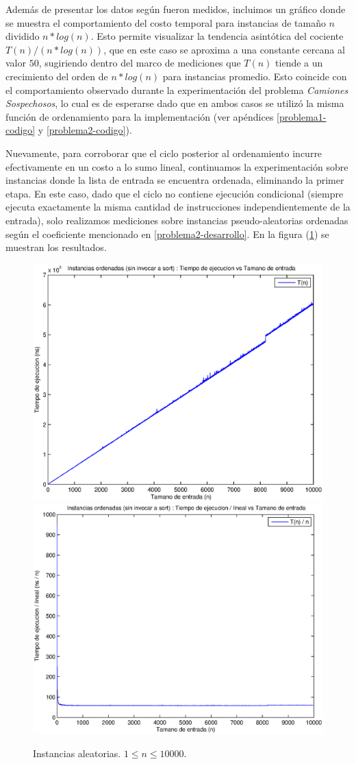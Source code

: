 Además de presentar los datos según fueron medidos, incluimos un gráfico donde se muestra el comportamiento del costo temporal para instancias de tamaño $n$ dividido $n * log(n)$. Esto permite visualizar la tendencia asintótica del cociente $T(n) / (n * log(n))$, que en este caso se aproxima a una constante cercana al valor $50$, sugiriendo dentro del marco de mediciones que $T(n)$ tiende a un crecimiento del orden de $n * log(n)$ para instancias promedio. Esto coincide con el comportamiento observado durante la experimentación del problema \emph{Camiones Sospechosos}, lo cual es de esperarse dado que en ambos casos se utilizó la misma función de ordenamiento para la implementación (ver apéndices \ref{problema1-codigo} y \ref{problema2-codigo}).

Nuevamente, para corroborar que el ciclo posterior al ordenamiento incurre efectivamente en un costo a lo sumo lineal, continuamos la experimentación sobre instancias donde la lista de entrada se encuentra ordenada, eliminando la primer etapa. En este caso, dado que el ciclo no contiene ejecución condicional (siempre ejecuta exactamente la misma cantidad de instrucciones independientemente de la entrada), solo realizamos mediciones sobre instancias pseudo-aleatorias ordenadas según el coeficiente mencionado en \ref{problema2-desarrollo}. En la figura (\ref{fig:problema2-ciclo}) se muestran los resultados.

\begin{center}
  \begin{figure}[H]
    \includegraphics[width=0.5\linewidth]{problema2/graficos/problema2_ordenada_10000.eps}
    \includegraphics[width=0.5\linewidth]{problema2/graficos/problema2_ordenada_10000_div_n.eps}
  \caption{Instancias aleatorias. $1 \leq n \leq 10000$.}
  \label{fig:problema2-ciclo}
  \end{figure}
\end{center}

